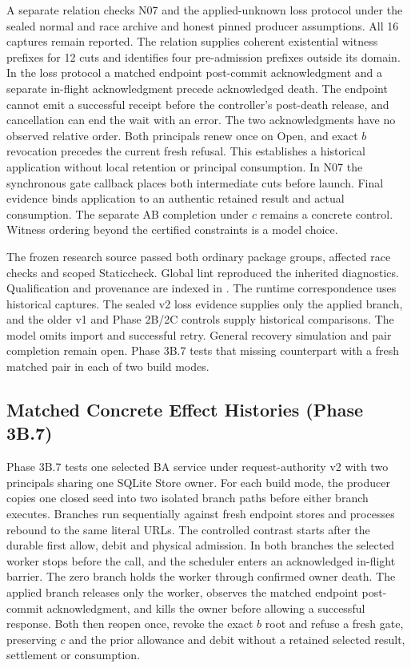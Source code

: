 \documentclass[11pt,a4paper]{article}
\theoremstyle{definition}
\theoremstyle{remark}
\begin{document}
A separate relation checks N07 and the applied-unknown loss protocol under the sealed normal and race archive and honest pinned producer assumptions. All 16 captures remain reported. The relation supplies coherent existential witness prefixes for 12 cuts and identifies four pre-admission prefixes outside its domain. In the loss protocol a matched endpoint post-commit acknowledgment and a separate in-flight acknowledgment precede acknowledged death. The endpoint cannot emit a successful receipt before the controller's post-death release, and cancellation can end the wait with an error. The two acknowledgments have no observed relative order. Both principals renew once on Open, and exact $b$ revocation precedes the current fresh refusal. This establishes a historical application without local retention or principal consumption. In N07 the synchronous gate callback places both intermediate cuts before launch. Final evidence binds application to an authentic retained result and actual consumption. The separate AB completion under $c$ remains a concrete control. Witness ordering beyond the certified constraints is a model choice.

The frozen research source passed both ordinary package groups, affected race checks and scoped Staticcheck. Global lint reproduced the inherited diagnostics. Qualification and provenance are indexed in . The runtime correspondence uses historical captures. The sealed v2 loss evidence supplies only the applied branch, and the older v1 and Phase 2B/2C controls supply historical comparisons. The model omits import and successful retry. General recovery simulation and pair completion remain open. Phase 3B.7 tests that missing counterpart with a fresh matched pair in each of two build modes.

\subsection{Matched Concrete Effect Histories (Phase 3B.7)}

Phase 3B.7 tests one selected BA service under request-authority v2 with two principals sharing one SQLite Store owner. For each build mode, the producer copies one closed seed into two isolated branch paths before either branch executes. Branches run sequentially against fresh endpoint stores and processes rebound to the same literal URLs. The controlled contrast starts after the durable first allow, debit and physical admission. In both branches the selected worker stops before the call, and the scheduler enters an acknowledged in-flight barrier. The zero branch holds the worker through confirmed owner death. The applied branch releases only the worker, observes the matched endpoint post-commit acknowledgment, and kills the owner before allowing a successful response. Both then reopen once, revoke the exact $b$ root and refuse a fresh gate, preserving $c$ and the prior allowance and debit without a retained selected result, settlement or consumption.
\end{document}
